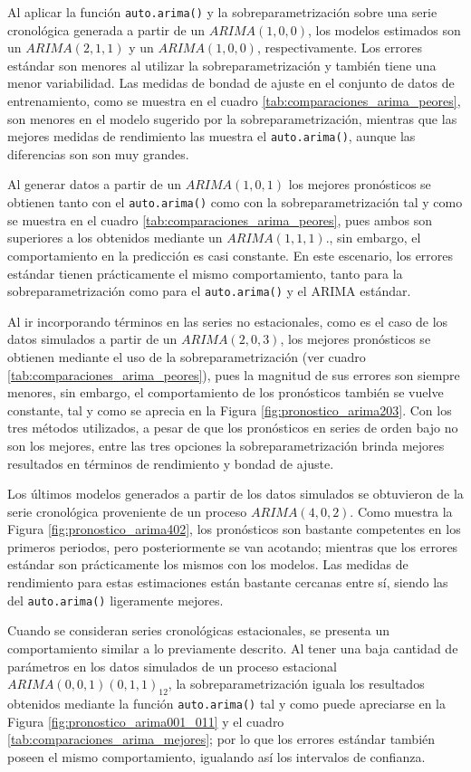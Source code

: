 \documentclass[
]{article}
\begin{document}
Al aplicar la función \texttt{auto.arima()} y la sobreparametrización
sobre una serie cronológica generada a partir de un \(ARIMA(1,0,0)\),
los modelos estimados son un \(ARIMA(2,1,1)\) y un \(ARIMA(1,0,0)\),
respectivamente. Los errores estándar son menores al utilizar la
sobreparametrización y también tiene una menor variabilidad. Las medidas
de bondad de ajuste en el conjunto de datos de entrenamiento, como se
muestra en el cuadro \ref{tab:comparaciones_arima_peores}, son menores
en el modelo sugerido por la sobreparametrización, mientras que las
mejores medidas de rendimiento las muestra el \texttt{auto.arima()},
aunque las diferencias son son muy grandes.

Al generar datos a partir de un \(ARIMA(1,0,1)\) los mejores pronósticos
se obtienen tanto con el \texttt{auto.arima()} como con la
sobreparametrización tal y como se muestra en el cuadro
\ref{tab:comparaciones_arima_peores}, pues ambos son superiores a los
obtenidos mediante un \(ARIMA(1,1,1)\)., sin embargo, el comportamiento
en la predicción es casi constante. En este escenario, los errores
estándar tienen prácticamente el mismo comportamiento, tanto para la
sobreparametrización como para el \texttt{auto.arima()} y el ARIMA
estándar.

Al ir incorporando términos en las series no estacionales, como es el
caso de los datos simulados a partir de un \(ARIMA(2,0,3)\), los mejores
pronósticos se obtienen mediante el uso de la sobreparametrización (ver
cuadro \ref{tab:comparaciones_arima_peores}), pues la magnitud de sus
errores son siempre menores, sin embargo, el comportamiento de los
pronósticos también se vuelve constante, tal y como se aprecia en la
Figura \ref{fig:pronostico_arima203}. Con los tres métodos utilizados, a
pesar de que los pronósticos en series de orden bajo no son los mejores,
entre las tres opciones la sobreparametrización brinda mejores
resultados en términos de rendimiento y bondad de ajuste.

Los últimos modelos generados a partir de los datos simulados se
obtuvieron de la serie cronológica proveniente de un proceso
\(ARIMA(4,0,2)\). Como muestra la Figura \ref{fig:pronostico_arima402},
los pronósticos son bastante competentes en los primeros periodos, pero
posteriormente se van acotando; mientras que los errores estándar son
prácticamente los mismos con los modelos. Las medidas de rendimiento
para estas estimaciones están bastante cercanas entre sí, siendo las del
\texttt{auto.arima()} ligeramente mejores.

Cuando se consideran series cronológicas estacionales, se presenta un
comportamiento similar a lo previamente descrito. Al tener una baja
cantidad de parámetros en los datos simulados de un proceso estacional
\(ARIMA(0,0,1)(0,1,1)_{12}\), la sobreparametrización iguala los
resultados obtenidos mediante la función \texttt{auto.arima()} tal y
como puede apreciarse en la Figura \ref{fig:pronostico_arima001_011} y
el cuadro \ref{tab:comparaciones_arima_mejores}; por lo que los errores
estándar también poseen el mismo comportamiento, igualando así los
intervalos de confianza.
\end{document}
